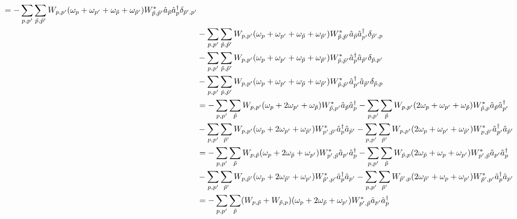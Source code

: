 \begin{appendix}
\begin{itemize}
\begin{align}
=-\Sum_{p,p^\prime}\Sum_{\tilde p,\tilde p^\prime}W_{p,p^\prime}(\omega_p+\omega_{p^\prime}+\omega_{\tilde p}+\omega_{\tilde p^\prime})W_{\tilde p,\tilde p^\prime}^*\AN_{\tilde p}\CR_p\delta_{\tilde p^\prime,p^\prime}\nonumber \\ \quad& 
-\Sum_{p,p^\prime}\Sum_{\tilde p,\tilde p^\prime}W_{p,p^\prime}(\omega_p+\omega_{p^\prime}+\omega_{\tilde p}+\omega_{\tilde p^\prime})W_{\tilde p,\tilde p^\prime}^*\AN_{\tilde p}\CR_{p^\prime}\delta_{\tilde p^\prime,p}\nonumber \\ \quad& 
-\Sum_{p,p^\prime}\Sum_{\tilde p,\tilde p^\prime}W_{p,p^\prime}(\omega_p+\omega_{p^\prime}+\omega_{\tilde p}+\omega_{\tilde p^\prime})W_{\tilde p,\tilde p^\prime}^*\CR_p\AN_{\tilde p^\prime}\delta_{\tilde p,p^\prime}\nonumber \\ \quad& 
-\Sum_{p,p^\prime}\Sum_{\tilde p,\tilde p^\prime}W_{p,p^\prime}(\omega_p+\omega_{p^\prime}+\omega_{\tilde p}+\omega_{\tilde p^\prime})W_{\tilde p,\tilde p^\prime}^*\CR_{p^\prime}\AN_{\tilde p^\prime}\delta_{\tilde p,p}\nonumber \\ \quad& 
=-\Sum_{p,p^\prime}\Sum_{\tilde p}W_{p,p^\prime}(\omega_p+2\omega_{p^\prime}+\omega_{\tilde p})W_{\tilde p,p^\prime}^*\AN_{\tilde p}\CR_p
-\Sum_{p,p^\prime}\Sum_{\tilde p}W_{p,p^\prime}(2\omega_p+\omega_{p^\prime}+\omega_{\tilde p})W_{\tilde p,p}^*\AN_{\tilde p}\CR_{p^\prime}\nonumber \\ \quad& 
-\Sum_{p,p^\prime}\Sum_{\tilde p^\prime}W_{p,p^\prime}(\omega_p+2\omega_{p^\prime}+\omega_{\tilde p^\prime})W_{p^\prime,\tilde p^\prime}^*\CR_p\AN_{\tilde p^\prime}
-\Sum_{p,p^\prime}\Sum_{\tilde p^\prime}W_{p,p^\prime}(2\omega_p+\omega_{p^\prime}+\omega_{\tilde p^\prime})W_{p,\tilde p^\prime}^*\CR_{p^\prime}\AN_{\tilde p^\prime}\nonumber \\ \quad& 
=-\Sum_{p,p^\prime}\Sum_{\tilde p}W_{p,\tilde p}(\omega_p+2\omega_{\tilde p}+\omega_{p^\prime})W_{p^\prime,\tilde p}^*\AN_{p^\prime}\CR_p
-\Sum_{p,p^\prime}\Sum_{\tilde p}W_{\tilde p,p}(2\omega_{\tilde p}+\omega_{p}+\omega_{p^\prime})W_{p^\prime,\tilde p}^*\AN_{p^\prime}\CR_{p}\nonumber \\ \quad& 
-\Sum_{p,p^\prime}\Sum_{\tilde p^\prime}W_{p,\tilde p^\prime}(\omega_p+2\omega_{\tilde p^\prime}+\omega_{ p^\prime})W_{\tilde p^\prime, p^\prime}^*\CR_p\AN_{ p^\prime}
-\Sum_{p,p^\prime}\Sum_{\tilde p^\prime}W_{\tilde p^\prime,p}(2\omega_{\tilde p^\prime}+\omega_p+\omega_{p^\prime})W_{\tilde p^\prime,{p^\prime}}^*\CR_p\AN_{p^\prime}\nonumber \\ \quad& 
=-\Sum_{p,p^\prime}\Sum_{\tilde p}(W_{p,\tilde p}+W_{\tilde p,p})(\omega_p+2\omega_{\tilde p}+\omega_{p^\prime})W_{p^\prime,\tilde p}^*\AN_{p^\prime}\CR_p\nonumber \\ \quad& 

\end{align}
\end{itemize}
\end{appendix}
